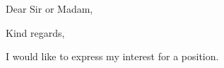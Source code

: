 \documentclass[10pt,a4paper]{moderncv}
\begin{document}
\date{\today}

\opening{Dear Sir or Madam,}
\closing{Kind regards,}

\makeletterhead

I would like to express my interest for a position.

\makeletterclosing
\end{document}

